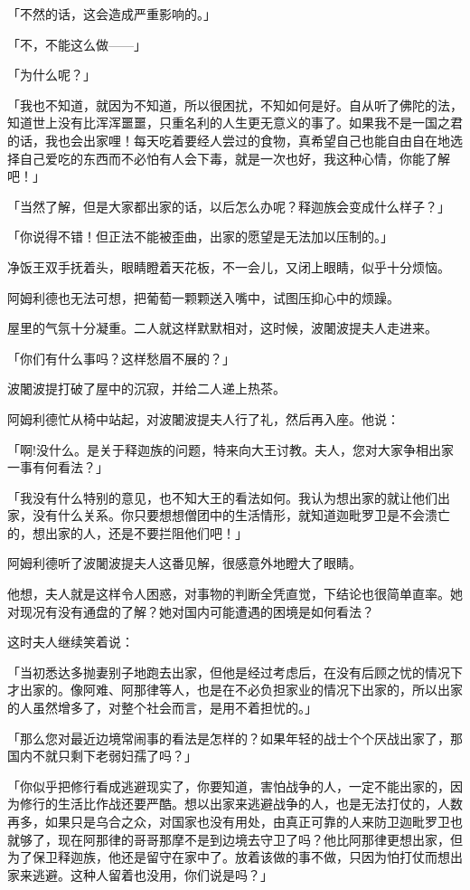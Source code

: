 \documentclass[twoside,openany]{book}
\begin{document}
「不然的话，这会造成严重影响的。」

「不，不能这么做——」

「为什么呢？」

「我也不知道，就因为不知道，所以很困扰，不知如何是好。自从听了佛陀的法，知道世上没有比浑浑噩噩，只重名利的人生更无意义的事了。如果我不是一国之君的话，我也会出家哩！每天吃着要经人尝过的食物，真希望自己也能自由自在地选择自己爱吃的东西而不必怕有人会下毒，就是一次也好，我这种心情，你能了解吧！」

「当然了解，但是大家都出家的话，以后怎么办呢？释迦族会变成什么样子？」

「你说得不错！但正法不能被歪曲，出家的愿望是无法加以压制的。」

净饭王双手抚着头，眼睛瞪着天花板，不一会儿，又闭上眼睛，似乎十分烦恼。

阿姆利德也无法可想，把葡萄一颗颗送入嘴中，试图压抑心中的烦躁。

屋里的气氛十分凝重。二人就这样默默相对，这时候，波闍波提夫人走进来。

「你们有什么事吗？这样愁眉不展的？」

波闍波提打破了屋中的沉寂，并给二人递上热茶。

阿姆利德忙从椅中站起，对波闍波提夫人行了礼，然后再入座。他说：

「啊!没什么。是关于释迦族的问题，特来向大王讨教。夫人，您对大家争相出家一事有何看法？」

「我没有什么特别的意见，也不知大王的看法如何。我认为想出家的就让他们出家，没有什么关系。你只要想想僧团中的生活情形，就知道迦毗罗卫是不会溃亡的，想出家的人，还是不要拦阻他们吧！」

阿姆利德听了波闍波提夫人这番见解，很感意外地瞪大了眼睛。

他想，夫人就是这样令人困惑，对事物的判断全凭直觉，下结论也很简单直率。她对现况有没有通盘的了解？她对国内可能遭遇的困境是如何看法？

这时夫人继续笑着说：

「当初悉达多抛妻别子地跑去出家，但他是经过考虑后，在没有后顾之忧的情况下才出家的。像阿难、阿那律等人，也是在不必负担家业的情况下出家的，所以出家的人虽然增多了，对整个社会而言，是用不着担忧的。」

「那么您对最近边境常闹事的看法是怎样的？如果年轻的战士个个厌战出家了，那国内不就只剩下老弱妇孺了吗？」

「你似乎把修行看成逃避现实了，你要知道，害怕战争的人，一定不能出家的，因为修行的生活比作战还要严酷。想以出家来逃避战争的人，也是无法打仗的，人数再多，如果只是乌合之众，对国家也没有用处，由真正可靠的人来防卫迦毗罗卫也就够了，现在阿那律的哥哥那摩不是到边境去守卫了吗？他比阿那律更想出家，但为了保卫释迦族，他还是留守在家中了。放着该做的事不做，只因为怕打仗而想出家来逃避。这种人留着也没用，你们说是吗？」
\end{document}

